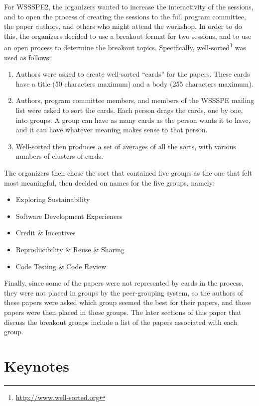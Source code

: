 \documentclass[11pt, oneside]{amsart}
\begin{document}
For WSSSPE2, the organizers wanted to increase the interactivity of the sessions, and to open the process of creating the sessions to the full program committee, the paper authors, and others who might attend the workshop.  In order to do this, the organizers decided to use a breakout format for two sessions, and to use an open process to determine the breakout topics.  Specifically, well-sorted\footnote{\url{http://www.well-sorted.org}} was used as follows:
\begin{enumerate}
\item Authors were asked to create well-sorted ``cards'' for the papers.  These cards have a title (50 characters maximum) and a body (255 characters maximum).
\item Authors, program committee members, and members of the WSSSPE mailing list were asked to sort the cards.  Each person drags the cards, one by one, into groups.  A group can have as many cards as the person wants it to have, and it can have whatever meaning makes sense to that person.
\item Well-sorted then produces a set of averages of all the sorts, with various numbers of clusters of cards.
\end{enumerate}

The organizers then chose the sort that contained five groups as the one that felt most meaningful, then decided on names for the five groups, namely:
\begin{itemize}
\item Exploring Sustainability
\item Software Development Experiences
\item Credit \& Incentives
\item Reproducibility \& Reuse \& Sharing
\item Code Testing \& Code Review
\end{itemize}

Finally, since some of the papers were not represented by cards in the process, they were not placed in groups by the peer-grouping system, so the authors of these papers were asked which group seemed the best for their papers, and those papers were then placed in those groups.  The later sections of this paper that discuss the breakout groups include a list of the papers associated with each group.

\section{Keynotes}
\end{document}
